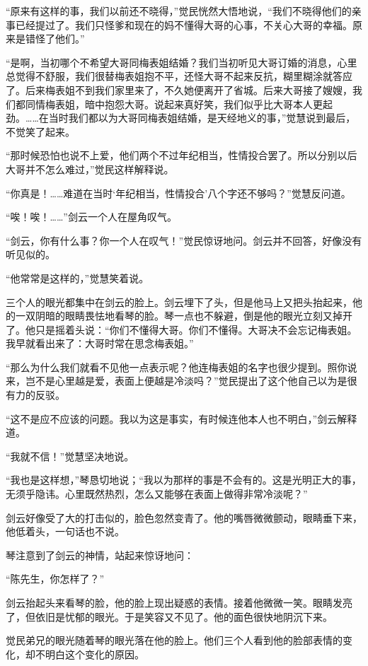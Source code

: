 \par “原来有这样的事，我们以前还不晓得，”觉民恍然大悟地说，“我们不晓得他们的亲事已经提过了。我们只怪爹和现在的妈不懂得大哥的心事，不关心大哥的幸福。原来是错怪了他们。”
\par “是啊，当初哪个不希望大哥同梅表姐结婚？我们当初听见大哥订婚的消息，心里总觉得不舒服，我们很替梅表姐抱不平，还怪大哥不起来反抗，糊里糊涂就答应了。后来梅表姐不到我们家里来了，不久她便离开了省城。后来大哥接了嫂嫂，我们都同情梅表姐，暗中抱怨大哥。说起来真好笑，我们似乎比大哥本人更起劲。……在当时我们都以为大哥同梅表姐结婚，是天经地义的事，”觉慧说到最后，不觉笑了起来。
\par “那时候恐怕也说不上爱，他们两个不过年纪相当，性情投合罢了。所以分别以后大哥并不怎么难过，”觉民这样解释说。
\par “你真是！……难道在当时‘年纪相当，性情投合’八个字还不够吗？”觉慧反问道。
\par “唉！唉！……”剑云一个人在屋角叹气。
\par “剑云，你有什么事？你一个人在叹气！”觉民惊讶地问。剑云并不回答，好像没有听见似的。
\par “他常常是这样的，”觉慧笑着说。
\par 三个人的眼光都集中在剑云的脸上。剑云埋下了头，但是他马上又把头抬起来，他的一双阴暗的眼睛畏怯地看琴的脸。琴一点也不躲避，倒是他的眼光立刻又掉开了。他只是摇着头说：“你们不懂得大哥。你们不懂得。大哥决不会忘记梅表姐。我早就看出来了：大哥时常在思念梅表姐。”
\par “那么为什么我们就看不见他一点表示呢？他连梅表姐的名字也很少提到。照你说来，岂不是心里越是爱，表面上便越是冷淡吗？”觉民提出了这个他自己以为是很有力的反驳。
\par “这不是应不应该的问题。我以为这是事实，有时候连他本人也不明白，”剑云解释道。
\par “我就不信！”觉慧坚决地说。
\par “我也是这样想，”琴恳切地说；“我以为那样的事是不会有的。这是光明正大的事，无须乎隐讳。心里既然热烈，怎么又能够在表面上做得非常冷淡呢？”
\par 剑云好像受了大的打击似的，脸色忽然变青了。他的嘴唇微微颤动，眼睛垂下来，他低着头，一句话也不说。
\par 琴注意到了剑云的神情，站起来惊讶地问：
\par “陈先生，你怎样了？”
\par 剑云抬起头来看琴的脸，他的脸上现出疑惑的表情。接着他微微一笑。眼睛发亮了，但依旧是忧郁的眼光。于是笑容又不见了。他的面色很快地阴沉下来。
\par 觉民弟兄的眼光随着琴的眼光落在他的脸上。他们三个人看到他的脸部表情的变化，却不明白这个变化的原因。
